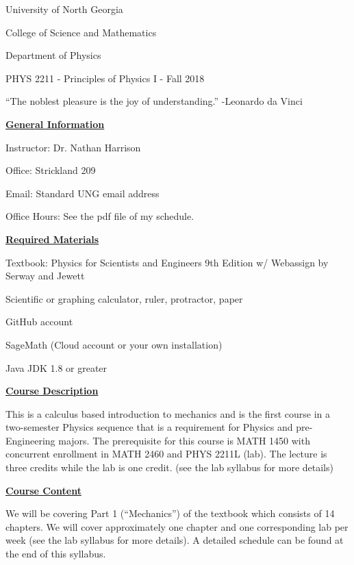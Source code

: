 \documentclass[12pt]{article}
\begin{document}
{\centering
\large University of North Georgia \par
\large College of Science and Mathematics \par
\large Department of Physics \par
\large PHYS 2211 - Principles of Physics I - Fall 2018 \par
}
\hfill \break \vspace{-4mm}

``The noblest pleasure is the joy of understanding.'' -Leonardo da Vinci
\hfill \break

\underline{\textbf{General Information}} \par
Instructor: Dr. Nathan Harrison \par
Office: Strickland 209 \par
Email: Standard UNG email address \par
Office Hours: See the pdf file of my schedule.
\hfill \break

\underline{\textbf{Required Materials}} \par
Textbook: Physics for Scientists and Engineers 9th Edition w/ Webassign by Serway and Jewett \par
Scientific or graphing calculator, ruler, protractor, paper \par
GitHub account \par
SageMath (Cloud account or your own installation) \par
Java JDK 1.8 or greater
\hfill \break

\underline{\textbf{Course Description}} \par
This is a calculus based introduction to mechanics and is the first course in a two-semester Physics sequence that is a requirement for Physics and pre-Engineering majors.
The prerequisite for this course is MATH 1450 with concurrent enrollment in MATH 2460 and PHYS 2211L (lab).
The lecture is three credits while the lab is one credit. (see the lab syllabus for more details)
\hfill \break

\underline{\textbf{Course Content}} \par
We will be covering Part 1 (“Mechanics”) of the textbook which consists of 14 chapters.
We will cover approximately one chapter and one corresponding lab per week (see the lab syllabus for more details).
A detailed schedule can be found at the end of this syllabus.
\hfill \break
\end{document}

